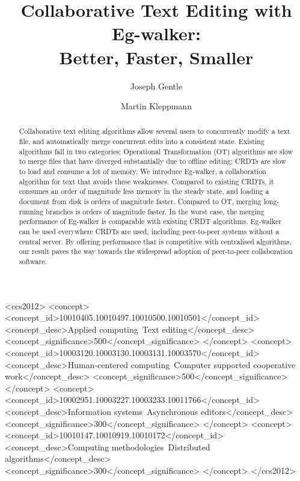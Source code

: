 \documentclass[sigplan,10pt]{acmart}
\newcommand{\algname}{Eg-walker\xspace}
\begin{document}
\def\sectionautorefname{Section}%
\def\subsectionautorefname{Section}%
\def\subsubsectionautorefname{Section}%

\title[Collaborative Text Editing with Eg-walker: Better, Faster, Smaller]{Collaborative Text Editing with Eg-walker:\\ Better, Faster, Smaller}
\author{Joseph Gentle}

\author{Martin Kleppmann}

\begin{abstract}
  Collaborative text editing algorithms allow several users to concurrently modify a text file, and automatically merge concurrent edits into a consistent state.
  Existing algorithms fall in two categories: Operational Transformation (OT) algorithms are slow to merge files that have diverged substantially due to offline editing; CRDTs are slow to load and consume a lot of memory.
  We introduce \algname, a collaboration algorithm for text that avoids these weaknesses.
  Compared to existing CRDTs, it consumes an order of magnitude less memory in the steady state, and loading a document from disk is orders of magnitude faster.
  Compared to OT, merging long-running branches is orders of magnitude faster.
  In the worst case, the merging performance of \algname is comparable with existing CRDT algorithms.
  \algname can be used everywhere CRDTs are used, including peer-to-peer systems without a central server.
  By offering performance that is competitive with centralised algorithms, our result paves the way towards the widespread adoption of peer-to-peer collaboration software.
\end{abstract}

\begin{CCSXML}
  <ccs2012>
    <concept>
      <concept_id>10010405.10010497.10010500.10010501</concept_id>
      <concept_desc>Applied computing~Text editing</concept_desc>
      <concept_significance>500</concept_significance>
    </concept>
    <concept>
      <concept_id>10003120.10003130.10003131.10003570</concept_id>
      <concept_desc>Human-centered computing~Computer supported cooperative work</concept_desc>
      <concept_significance>500</concept_significance>
    </concept>
    <concept>
      <concept_id>10002951.10003227.10003233.10011766</concept_id>
      <concept_desc>Information systems~Asynchronous editors</concept_desc>
      <concept_significance>300</concept_significance>
    </concept>
    <concept>
      <concept_id>10010147.10010919.10010172</concept_id>
      <concept_desc>Computing methodologies~Distributed algorithms</concept_desc>
      <concept_significance>300</concept_significance>
    </concept>
  </ccs2012>
\end{CCSXML}
\end{document}
